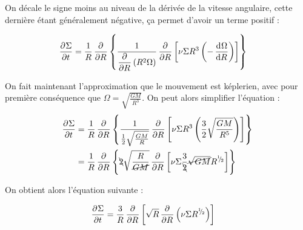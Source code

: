 On décale le signe moins au niveau de la dérivée de la vitesse angulaire, cette dernière étant généralement négative, ça permet d'avoir un terme positif :
\begin{important}
\begin{align}
\mathinner{ \dfrac{\partial{^{}}\Sigma}{\partial{{t}^{}}} } &= \frac{1}{R}\mathinner{ \dfrac{\partial{^{}}}{\partial{{R}^{}}} }\left\{\frac{1}{\mathinner{ \dfrac{\partial{^{}}}{\partial{{R}^{}}} }\left(R^2\Omega\right)} \mathinner{ \dfrac{\partial{^{}}}{\partial{{R}^{}}} }\left[\nu \Sigma R^3 \left(-\mathinner{ \dfrac{\operatorname{d \!}{^{}}\Omega}{\operatorname{d \!}{{R}^{}}} }\right)\right]\right\}
\end{align}
\end{important}

\bigskip

On fait maintenant l'approximation que le mouvement est képlerien, avec pour première conséquence que $\Omega = \sqrt{\frac{GM}{R^3}}$. On peut alors simplifier l'équation : 
\begin{align*}
\dpd{\Sigma}{t} &= \inv{R}\dpd{}{R}\left\{\inv{\inv{2}\sqrt{\frac{GM}{R}}} \dpd{}{R}\left[\nu \Sigma R^3 \left(\frac{3}{2}\sqrt{\frac{GM}{R^5}}\right)\right]\right\}\nonumber\\
&= \inv{R}\dpd{}{R}\left\{\bcancel{2}\sqrt{\frac{R}{\cancel{GM}}} \dpd{}{R}\left[\nu \Sigma \frac{3}{\bcancel{2}}\cancel{\sqrt{GM}}R^\sfrac{1}{2}\right]\right\}\nonumber\\
\end{align*}

On obtient alors l'équation suivante : 
\begin{important}
\begin{align}
\mathinner{ \dfrac{\partial{^{}}\Sigma}{\partial{{t}^{}}} } &=\frac{3}{R}\mathinner{ \dfrac{\partial{^{}}}{\partial{{R}^{}}} }\left[\sqrt{R} \mathinner{ \dfrac{\partial{^{}}}{\partial{{R}^{}}} }\left(\nu \Sigma R^{{}^{1\!\!}/ _{\!2}}\right)\right]
\end{align}
\end{important}
